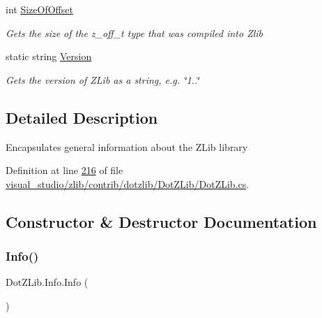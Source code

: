 \begin{DoxyCompactItemize}
int \hyperlink{class_dot_z_lib_1_1_info_ad1ea695cbf9012e1b458f0a754dcfe7f}{Size\+Of\+Offset}
\begin{DoxyCompactList}\small\item\em Gets the size of the z\+\_\+off\+\_\+t type that was compiled into Zlib \end{DoxyCompactList}\item 
static string \hyperlink{class_dot_z_lib_1_1_info_a55b101b2c131860775880231fdf5fbd7}{Version}
\begin{DoxyCompactList}\small\item\em Gets the version of Z\+Lib as a string, e.\+g. \char`\"{}1..\char`\"{} \end{DoxyCompactList}\end{DoxyCompactItemize}


\subsection{Detailed Description}
Encapsulates general information about the Z\+Lib library 



Definition at line \hyperlink{visual__studio_2zlib_2contrib_2dotzlib_2_dot_z_lib_2_dot_z_lib_8cs_source_l00216}{216} of file \hyperlink{visual__studio_2zlib_2contrib_2dotzlib_2_dot_z_lib_2_dot_z_lib_8cs_source}{visual\+\_\+studio/zlib/contrib/dotzlib/\+Dot\+Z\+Lib/\+Dot\+Z\+Lib.\+cs}.



\subsection{Constructor \& Destructor Documentation}
\mbox{\label{class_dot_z_lib_1_1_info_a48b690fe56ca7cc8e8a40a740476696b}} 
\subsubsection{\texorpdfstring{Info()}{Info()}\hspace{0.1cm}{\footnotesize\ttfamily [1/2]}}
{\footnotesize\ttfamily Dot\+Z\+Lib.\+Info.\+Info (\begin{DoxyParamCaption}{ }\end{DoxyParamCaption})\hspace{0.3cm}{\ttfamily [inline]}}



